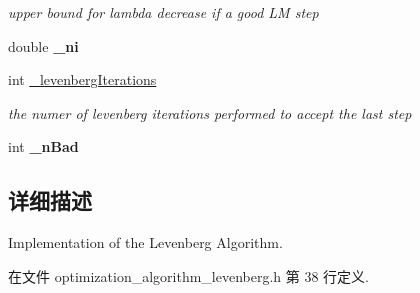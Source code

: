 \begin{DoxyCompactItemize}
\begin{DoxyCompactList}\small\item\em upper bound for lambda decrease if a good L\-M step \end{DoxyCompactList}\item 
\hypertarget{classg2o_1_1OptimizationAlgorithmLevenberg_a8bcb1a957056cba788072992c5a8a7a1}{double {\bfseries \-\_\-ni}}\label{classg2o_1_1OptimizationAlgorithmLevenberg_a8bcb1a957056cba788072992c5a8a7a1}

\item 
\hypertarget{classg2o_1_1OptimizationAlgorithmLevenberg_a2319771c8d3ee0f773bdb86d5416bab7}{int \hyperlink{classg2o_1_1OptimizationAlgorithmLevenberg_a2319771c8d3ee0f773bdb86d5416bab7}{\-\_\-levenberg\-Iterations}}\label{classg2o_1_1OptimizationAlgorithmLevenberg_a2319771c8d3ee0f773bdb86d5416bab7}

\begin{DoxyCompactList}\small\item\em the numer of levenberg iterations performed to accept the last step \end{DoxyCompactList}\item 
\hypertarget{classg2o_1_1OptimizationAlgorithmLevenberg_a7f0b375c45a9f91f2676548591273c8d}{int {\bfseries \-\_\-n\-Bad}}\label{classg2o_1_1OptimizationAlgorithmLevenberg_a7f0b375c45a9f91f2676548591273c8d}

\end{DoxyCompactItemize}


\subsection{详细描述}
Implementation of the Levenberg Algorithm. 

在文件 optimization\-\_\-algorithm\-\_\-levenberg.\-h 第 38 行定义.



